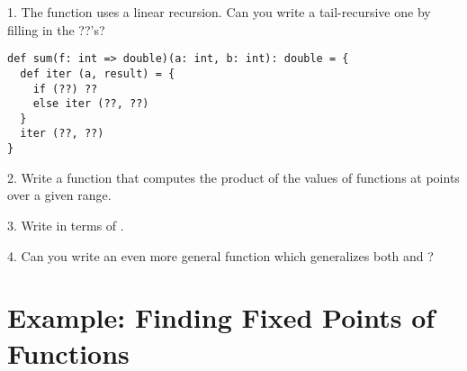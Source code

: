 \documentclass[a4paper,12pt,twoside,titlepage]{book}
\begin{document}
1. The  function uses a linear recursion. Can you write a
tail-recursive one by filling in the ??'s?

\begin{lstlisting}
def sum(f: int => double)(a: int, b: int): double = {
  def iter (a, result) = {
    if (??) ??
    else iter (??, ??)
  }
  iter (??, ??)
}
\end{lstlisting}

2. Write a function  that computes the product of the
values of functions at points over a given range.

3. Write  in terms of .

4. Can you write an even more general function which generalizes both
 and ?

\section{Example: Finding Fixed Points of Functions}
\end{document}
